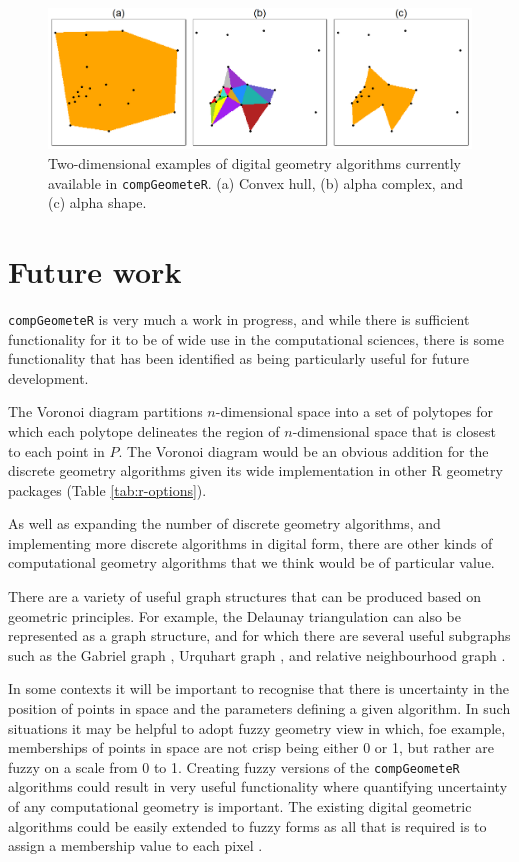 \documentclass[12pt, a4paper]{article}
\begin{document}
\begin{figure}[ht]
\centering
\includegraphics{figures/figure-2/figure-2.png}
\caption{Two-dimensional examples of digital geometry algorithms currently available in \texttt{compGeometeR}. (a) Convex hull, (b) alpha complex, and (c) alpha shape.}
\label{fig:digital-algorithms}
\end{figure}

\section{Future work}

\texttt{compGeometeR} is very much a work in progress, and while there is sufficient functionality for it to be of wide use in the computational sciences, there is some functionality that has been identified as being particularly useful for future development.

The Voronoi diagram \citep{voronoi-1908, okabe-2000} partitions $n$-dimensional space into a set of polytopes for which each polytope delineates the region of $n$-dimensional space that is closest to each point in $P$.  The Voronoi diagram would be an obvious addition for the discrete geometry algorithms given its wide implementation in other R geometry packages (Table \ref{tab:r-options}).

As well as expanding the number of discrete geometry algorithms, and implementing more discrete algorithms in digital form, there are other kinds of computational geometry algorithms that we think would be of particular value.

There are a variety of useful graph structures that can be produced based on geometric principles.  For example, the Delaunay triangulation \citep{delaunay-1934} can also be represented as a graph structure, and for which there are several useful subgraphs such as the Gabriel graph \citep{gabriel-1969}, Urquhart graph \citep{urquhart-1980}, and relative neighbourhood graph \citep{toussaint-1980}.

In some contexts it will be important to recognise that there is uncertainty in the position of points in space and the parameters defining a given algorithm.  In such situations it may be helpful to adopt fuzzy geometry \citep{rosenfeld-1998} view in which, foe example, memberships of points in space are not crisp being either 0 or 1, but rather are fuzzy on a scale from 0 to 1.  Creating fuzzy versions of the \texttt{compGeometeR} algorithms could result in very useful functionality where quantifying uncertainty of any computational geometry is important.  The existing digital geometric algorithms could be easily extended to fuzzy forms as all that is required is to assign a membership value to each pixel \citep{klette-2004}.
\end{document}
